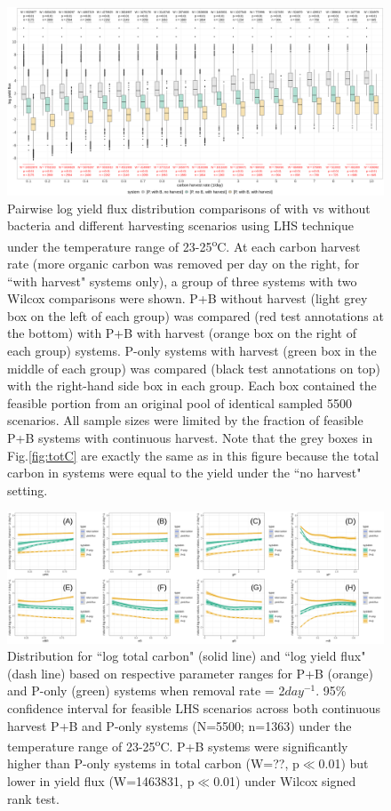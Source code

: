 \documentclass[../thesis.tex]{subfiles} %
\begin{document}
\begin{figure}[H]
    \centering
    \includegraphics[width=\linewidth]{../result/yield.png}
    \caption[Pairwise log yield flux]{Pairwise log yield flux distribution comparisons of with vs without bacteria and different harvesting scenarios using LHS technique under the temperature range of 23-25\textsuperscript{o}C.  {\scriptsize At each carbon harvest rate (more organic carbon was removed per day on the right, for ``with harvest" systems only), a group of three systems with two Wilcox comparisons were shown.  P+B without harvest (light grey box on the left of each group) was compared (red test annotations at the bottom) with P+B with harvest (orange box on the right of each group) systems.  P-only systems with harvest (green box in the middle of each group) was compared (black test annotations on top) with the right-hand side box in each group.  Each box contained the feasible portion from an original pool of identical sampled 5500 scenarios.  All sample sizes were limited by the fraction of feasible P+B systems with continuous harvest.  Note that the grey boxes in Fig.\ref{fig:totC} are exactly the same as in this figure because the total carbon in systems were equal to the yield under the ``no harvest" setting.}}
    \label{fig:yield}
\end{figure}

\begin{figure}[H]
    \centering
    \includegraphics[width=\linewidth]{../result/var_20.png}
    \caption[Log carbon distribution for $x=2day^{-1}$ by parameter]{Distribution for ``log total carbon" (solid line) and ``log yield flux" (dash line) based on respective parameter ranges for P+B (orange) and P-only (green) systems when removal rate = 2$day^{-1}$.  {\scriptsize 95\% confidence interval for feasible LHS scenarios across both continuous harvest P+B and P-only systems (N=5500; n=1363) under the temperature range of 23-25\textsuperscript{o}C.  P+B systems were significantly higher than P-only systems in total carbon (W=??, p$\ll$0.01) but lower in yield flux (W=1463831, p$\ll$0.01) under Wilcox signed rank test.}}
    \label{fig:v2}
\end{figure}
\end{document}
